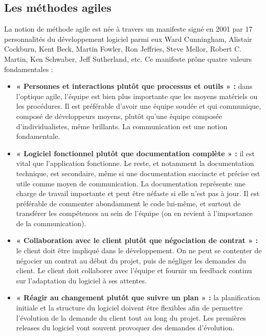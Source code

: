     \subsection{Les méthodes agiles}
        La notion de méthode agile est née à travers un manifeste signé en 2001 par 17 personnalités du développement logiciel parmi eux Ward Cunningham, Alistair Cockburn, Kent Beck, Martin Fowler, Ron Jeffries, Steve Mellor, Robert C. Martin, Ken Schwaber, Jeff Sutherland, etc. Ce manifeste prône quatre valeurs fondamentales :
    \begin{itemize}
        \item [\textbullet] \textbf{« Personnes et interactions plutôt que processus et outils » :}
            dans l’optique agile, l’équipe est bien plus importante que les moyens matériels ou les procédures. Il est préférable d’avoir une équipe soudée et qui communique, composé de développeurs moyens, plutôt qu’une équipe composée d’individualistes, même brillants. La communication est une notion fondamentale.
        \item [\textbullet] \textbf{« Logiciel fonctionnel plutôt que documentation complète » :}
            il est vital que l’application fonctionne. Le reste, et notamment la documentation technique, est secondaire, même si une documentation succincte et précise est utile comme moyen de communication. La documentation représente une charge de travail importante et peut être néfaste si elle n’est pas à jour. Il est préférable de commenter abondamment le code lui-même, et surtout de transférer les compétences au sein de l’équipe (on en revient à l’importance de la communication).
        \item [\textbullet] \textbf{« Collaboration avec le client plutôt que négociation de contrat » :}
            le client doit être impliqué dans le développement. On ne peut se contenter de négocier un contrat au début du projet, puis de négliger les demandes du client. Le client doit collaborer avec l’équipe et fournir un feedback continu sur l’adaptation du logiciel à ses attentes.
        \item [\textbullet] \textbf{« Réagir au changement plutôt que suivre un plan » :}
            la planification initiale et la structure du logiciel doivent être flexibles afin de permettre l’évolution de la demande du client tout au long du projet. Les premières releases du logiciel vont souvent provoquer des demandes d’évolution\cite{5}. 
    \end{itemize}
    
